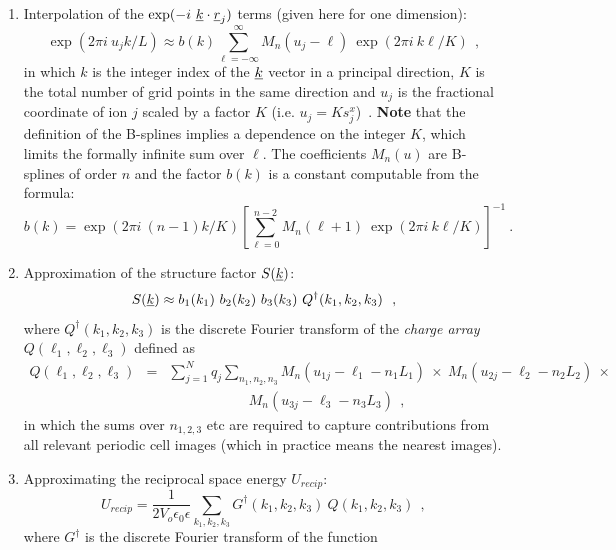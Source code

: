 \begin{enumerate}
\item Interpolation of the $\exp(-i~\mbox{$\underline{k}$}\cdot\mbox{$\underline{r}$}_{j})$ terms
(given here for one dimension):
\begin{equation}
\exp(2\pi i~u_{j} k/L) \approx b(k) \sum_{\ell=-\infty}^{\infty}
M_{n}(u_{j}-\ell)~\exp(2\pi i~k\ell/K)~~,
\end{equation}
in which $k$ is the integer index of the $\mbox{$\underline{k}$}$ vector in a
principal direction, $K$ is the total number of grid points in the
same direction and $u_{j}$ is the fractional coordinate of ion $j$
scaled by a factor $K$ (i.e. $u_{j}=K s_{j}^{x}$)~.  {\bf Note} that
the definition of the B-splines implies a dependence on the integer
$K$, which limits the formally infinite sum over $\ell$.  The
coefficients $M_{n}(u)$ are B-splines of order $n$ and the factor
$b(k)$ is a constant computable from the formula:
\begin{equation}
b(k) = \exp(2\pi i~(n-1)k/K) \left[ \sum_{\ell=0}^{n-2}
M_{n}(\ell+1)~\exp(2\pi i~k\ell/K) \right]^{-1}~.
\end{equation}
\item Approximation of the structure factor $S(\mbox{$\underline{k}$})$:
\begin{equation}
S(\mbox{$\underline{k}$}) \approx b_{1}(k_{1})~b_{2}(k_{2})~b_{3}(k_{3})~Q^{\dagger}(k_{1},k_{2},k_{3})~~,
\end{equation}
where $Q^{\dagger}(k_{1},k_{2},k_{3})$ is the discrete Fourier transform of
the {\em charge array} $Q(\ell_{1},\ell_{2},\ell_{3})$ defined as
\begin{eqnarray}
Q(\ell_{1},\ell_{2},\ell_{3})&=& \sum_{j=1}^{N}q_{j}
\sum_{n_{1},n_{2},n_{3}} M_{n}(u_{1j}-\ell_{1}-n_{1}L_{1})~\times~
M_{n}(u_{2j}-\ell_{2}-n_{2}L_{2})~\times~ \phantom{xxxx} \nonumber \\
& & \phantom{xxxxxxxxxx} M_{n}(u_{3j}-\ell_{3}-n_{3}L_{3})~~,
\end{eqnarray}
in which the sums over $n_{1,2,3}$ etc are required to capture
contributions from all relevant periodic cell images (which in
practice means the nearest images).
\item Approximating the reciprocal space energy $U_{recip}$:
\begin{equation}
U_{recip} = \frac{1}{2V_{o} \epsilon_{0}\epsilon} \sum_{k_{1},k_{2},k_{3}}
G^{\dagger}(k_{1},k_{2},k_{3})~Q(k_{1},k_{2},k_{3})~~,
\end{equation}
where $G^{\dagger}$ is the discrete Fourier transform of the
function
\begin{equation}

\end{equation}
\end{enumerate}
